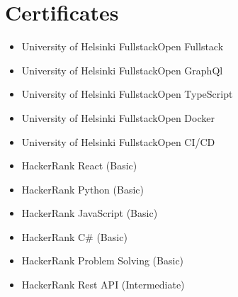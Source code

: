 \section{Certificates}

\begin{itemize}
	\item University of Helsinki FullstackOpen Fullstack
	\item University of Helsinki FullstackOpen GraphQl
	\item University of Helsinki FullstackOpen TypeScript
	\item University of Helsinki FullstackOpen Docker
	\item University of Helsinki FullstackOpen CI/CD
	\item HackerRank React (Basic)
	\item HackerRank Python (Basic)
	\item HackerRank JavaScript (Basic)
	\item HackerRank C\# (Basic)
	\item HackerRank Problem Solving (Basic)
	\item HackerRank Rest API (Intermediate)
\end{itemize}